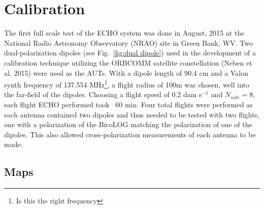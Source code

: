 \documentclass[preprint2]{aastex}
\begin{document}

\section{Calibration}

The first full scale test of the ECHO system was done in August, 2015 at the National Radio Astronomy Observatory (NRAO) site in Green Bank, WV.  Two dual-polarization dipoles (see Fig.~\ref{fig:dual dipole}) used in the development of a calibration technique utilizing the ORBCOMM satellite constellation (Neben et al. 2015) were used as the AUTs.  With a dipole length of 90.4 cm and a Valon synth frequency of 137.554 MHz\footnote{Is this the right frequency}, a flight radius of 100m was chosen, well into the far-field of the dipoles.  Choosing a flight speed of 0.2 dam s$^{-1}$ and $N_{side}=8$, each flight ECHO performed took ~60 min.  Four total flights were performed as each antenna contained two dipoles and thus needed to be tested with two flights, one with a polarization of the BicoLOG matching the polarization of one of the dipoles.  This also allowed cross-polarization measurements of each antenna to be made.


\subsection{Maps}
\end{document}
